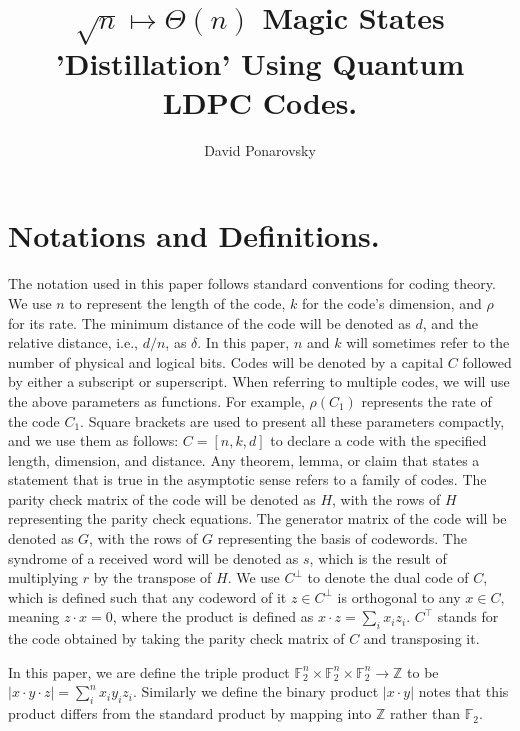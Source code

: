 \documentclass[manuscript,screen,review]{acmart}
\begin{document}

\title{ $\sqrt{n} \mapsto \Theta(n)$  Magic States 'Distillation' Using
Quantum LDPC Codes. }
\author{David Ponarovsky}
\maketitle

\newcommand*{\Mbas}{\mathcal{X}^\prime}
\newcommand*{\sMbas}{\text{span }\Mbas}
\newcommand*{\QQ}{C_{X}/C_{Z}^\perp }
\newcommand*{\trig}{Triorthogonal }
\newcommand*{\Hyp}{Hyperproduct }
\newcommand*{\Cin}{ C_{\text{initial}} }
\newcommand*{\Ctan}{ C_{\text{Tanner}} }


\section{Notations and Definitions.} The notation used in this paper follows standard conventions for coding theory. We use $n$ to represent the length of the code, $k$ for the code's dimension, and $\rho$ for its rate. The minimum distance of the code will be denoted as $d$, and the relative distance, i.e., $d/n$, as $\delta$. In this paper, $n$ and $k$ will sometimes refer to the number of physical and logical bits. Codes will be denoted by a capital $C$ followed by either a subscript or superscript. When referring to multiple codes, we will use the above parameters as functions. For example, $\rho(C_{1})$ represents the rate of the code $C_{1}$. Square brackets are used to present all these parameters compactly, and we use them as follows: $C=[n,k,d]$ to declare a code with the specified length, dimension, and distance. Any theorem, lemma, or claim that states a statement that is true in the asymptotic sense refers to a family of codes. The parity check matrix of the code will be denoted as $H$, with the rows of $H$ representing the parity check equations. The generator matrix of the code will be denoted as $G$, with the rows of $G$ representing the basis of codewords. The syndrome of a received word will be denoted as $s$, which is the result of multiplying $r$ by the transpose of $H$. We use $C^\perp$ to denote the dual code of $C$, which is defined such that any codeword of it $z\in C^\perp$ is orthogonal to any $x\in C$, meaning $z\cdot x = 0$, where the product is defined as $x\cdot z = \sum_{i}{x_{i}z_{i}}$. $C^{\top}$ stands for the code obtained by taking the parity check matrix of $C$ and transposing it.

In this paper, we are define the triple product $\mathbb{F}_2^{n}\times \mathbb{F}_2^{n}\times\mathbb{F}_2^{n} \rightarrow \mathbb{Z}$ to be $|x\cdot y \cdot z| = \sum_{i}^{n}{x_{i}y_{i}z_{i}}$. Similarly we define the binary product $|x \cdot y|$ notes that this product differs from the standard product by mapping into $\mathbb{Z}$ rather than $\mathbb{F}_{2}$.
\end{document}
